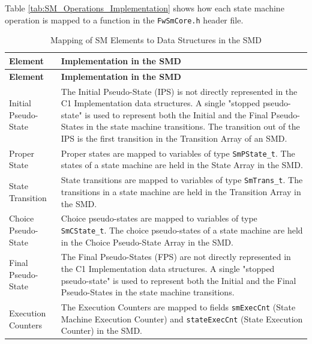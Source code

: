 \documentclass[a4paper,10pt]{article}
\begin{document}
Table \ref{tab:SM_Operations_Implementation} shows how each state machine operation is 
mapped to a function in the \texttt{FwSmCore.h} header file.

\begin{longtable}{|>{\raggedright}p{2.7cm}|P{8.5cm}|}
\caption{Mapping of SM Elements to Data Structures in the SMD}
\label{tab:SM_Elements_Implementation}\\
\hline
{}
\textbf{Element} & \textbf{Implementation in the SMD} \\
\hline
\endfirsthead
{}
\textbf{Element} & \textbf{Implementation in the SMD} \\
\hline
\endhead
Initial Pseudo-State & The Initial Pseudo-State (IPS) is not directly represented in the C1 Implementation data structures. 
A single "stopped pseudo-state" is used to represent both the Initial and the Final Pseudo-States
in the state machine transitions.
The transition out of the IPS is the first transition in the Transition Array of an SMD.\\
\hline
Proper State & Proper states are mapped to variables of type \texttt{SmPState\_t}. 
The states of a state machine are held in the State Array in the SMD. \\
\hline
State Transition & State transitions are mapped to variables of type \texttt{SmTrans\_t}. 
The transitions in a state machine are held in the Transition Array in the SMD. \\
\hline
Choice Pseudo-State & Choice pseudo-states are mapped to variables of type \texttt{SmCState\_t}. 
The choice pseudo-states of a state machine are held in the Choice Pseudo-State Array in the SMD.\\
\hline
Final Pseudo-State & The Final Pseudo-States (FPS) are not directly represented in the C1 Implementation data structures.
A single "stopped pseudo-state" is used to represent both the Initial and the Final Pseudo-States
in the state machine transitions.\\
\hline
Execution Counters & The Execution Counters are mapped to fields \texttt{smExecCnt} 
(State Machine Execution Counter) and \texttt{stateExecCnt} (State Execution Counter) in the SMD.\\
\hline
\end{longtable}
\end{document}
